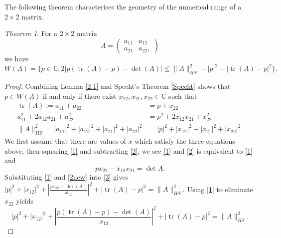 \documentclass[12pt]{article}
\theoremstyle{plain}
\theoremstyle{definition}
\theoremstyle{remark}
\newcommand{\tr}{\operatorname{tr}}
\newtheorem{Theorem}{Theorem}[section]
\newtheorem{Lemma}[Theorem]{Lemma}
\numberwithin{equation}{section}
\begin{document}
The following theorem characterises the geometry of the numerical range of a $2 \times 2$ matrix.



\begin{Theorem}\label{main2}
    For a $2 \times 2$ matrix $$
    A = \begin{pmatrix}
        a_{11} & a_{12} \\
        a_{21} & a_{22},
    \end{pmatrix}
    $$ we have $ W(A) = \{ p \in \mathbb{C} : 2|p(\tr(A)-p) - \det(A)| \leqslant \|A\|_{HS}^2 - |p|^2 -  |\tr(A)-p|^2 \}.$
\end{Theorem}
\begin{proof}


Combining Lemma \ref{2.1} and Specht's Theorem \ref{Specht} shows that $p \in W(A)$ if and only if there exist $x_{12}, x_{21}, x_{22} \in \mathbb{C}$ such that
\begin{align}
    \tr(A):= a_{11} + a_{22} &=p+ x_{22} \label{1} \\
    a_{11}^2 + 2a_{12}a_{21} + a_{22}^2 &= p^2 + 2x_{12}x_{21} + x_{22}^2 \label{2}\\
     \|A\|_{HS}^2  = |a_{11}|^2 + |a_{12}|^2 + |a_{21}|^2 + |a_{22}|^2 &= |p|^2+ |x_{12}|^2 + |x_{21}|^2 + |x_{22}|^2. \label{3}
\end{align}
We first assume that there are values of $x$ which satisfy the three equations above, then squaring \eqref{1} and subtracting \eqref{2}, we see \eqref{1} and \eqref{2} is equivalent to \eqref{1} and \begin{equation}\label{2new}
    px_{22}-x_{12} x_{21} = \det A .
\end{equation}
Substituting \eqref{1} and \eqref{2new} into \eqref{3} gives $|p|^2 + |x_{12}|^2  + \left|\frac{px_{22} - \det(A)}{x_{12}}\right|^2 +|\tr(A)-p|^2 = \|A\|_{HS}^2.$ Using \eqref{1} to eliminate $x_{22}$ yields
\begin{equation}\label{allequiv}
    |p|^2 + |x_{12}|^2  + \left|\frac{p(\tr(A)-p) - \det(A)}{x_{12}}\right|^2 +|\tr(A)-p|^2 = \|A\|_{HS}^2.
\end{equation}


\end{proof}
\end{document}
